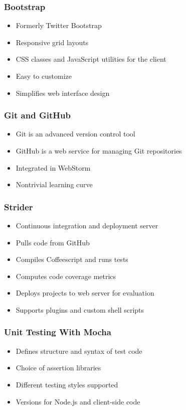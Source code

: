 \documentclass{beamer}
\begin{document}
\begin{frame}[fragile]
\frametitle{Bootstrap}
	\begin{itemize}
  	 \item Formerly Twitter Bootstrap
	 \item Responsive grid layouts
	 \item CSS classes and JavaScript utilities for the client
  	 \item Easy to customize
	 \item Simplifies web interface design
	\end{itemize}
\end{frame}

\begin{frame}[fragile]
\frametitle{Git and GitHub}
	\begin{itemize}
  	 \item Git is an advanced version control tool
	 \item GitHub is a web service for managing Git repositories
  	 \item Integrated in WebStorm
	 \item Nontrivial learning curve
	\end{itemize}
\end{frame}

\begin{frame}[fragile]
\frametitle{Strider}
	\begin{itemize}
  	 \item Continuous integration and deployment server
	 \item Pulls code from GitHub
  	 \item Compiles Coffeescript and runs tests
	 \item Computes code coverage metrics
	 \item Deploys projects to web server for evaluation
  	 \item Supports plugins and custom shell scripts
	\end{itemize}
\end{frame}

\begin{frame}[fragile]
\frametitle{Unit Testing With Mocha}
	\begin{itemize}
  	 \item Defines structure and syntax of test code
	 \item Choice of assertion libraries
  	 \item Different testing styles supported
	 \item Versions for Node.js and client-side code
	\end{itemize}
\end{frame}
\end{document}

